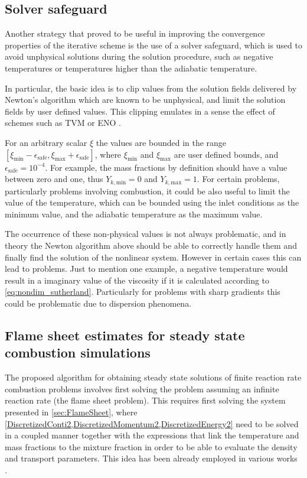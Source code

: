 \subsection{Solver safeguard}
Another strategy that proved to be useful in improving the convergence properties of the iterative scheme is the use of a solver safeguard, which is used to avoid unphysical solutions during the solution procedure, such as negative temperatures or temperatures higher than the adiabatic temperature.

In particular, the basic idea is to clip values from the solution fields delivered by Newton's algorithm which are known to be unphysical, and limit the solution fields by user defined values. This clipping emulates in a sense the effect of schemes such as \gls{TVM} or \gls{ENO} \parencite{nicoudConservativeHighOrderFiniteDifference2000}. 

For an arbitrary scalar $\xi$ the values are bounded in the range $[\xi_{\text{min}} - \epsilon_{\text{safe}}, \xi_{\text{max}} + \epsilon_{\text{safe}}]$, where $\xi_{\text{min}}$ and $\xi_{\text{max}}$ are user defined bounds, and  $\epsilon_{\text{safe}} = 10^{-4}$. For example, the mass fractions by definition should have a value between zero and one, thus $Y_{k,\text{min}} = 0$ and  $Y_{k,\text{max}} = 1$. For certain problems, particularly problems involving combustion, it could be also useful to limit the value of the temperature, which can be bounded using the inlet conditions as the minimum value, and the adiabatic temperature as the maximum value.

The occurrence of these non-physical values is not always problematic, and in theory the Newton algorithm above should be able to correctly handle them and finally find the solution of the nonlinear system. However in certain cases this can lead to problems. Just to mention one example, a negative temperature would result in a imaginary value of the viscosity if it is calculated according to \cref{eq:nondim_sutherland}. Particularly for problems with sharp gradients this could be problematic due to dispersion phenomena. 

\subsection{Flame sheet estimates for steady state combustion simulations}\label{ssec:MethodCombustion}
The proposed algorithm for obtaining steady state solutions of finite reaction rate combustion problems involves first solving the problem assuming an infinite reaction rate (the flame sheet problem). This requires first solving the system presented in \cref{sec:FlameSheet}, where \cref{DiscretizedConti2,DiscretizedMomentum2,DiscretizedEnergy2} need to be solved in a coupled manner together with the expressions that link the temperature and mass fractions to the mixture fraction in order to be able to evaluate the density and transport parameters. This idea has been already employed in various works \parencite{smookeNumericalSolutionTwoDimensional1986,smookeNumericalModelingAxisymmetric1992}.

